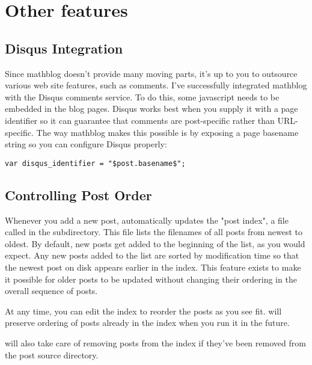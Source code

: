 \documentclass[11pt, letterpaper, oneside, titlepage]{book}
\begin{document}
\section{Other features}

\subsection{Disqus Integration}

Since mathblog doesn't provide many moving parts, it's up to you to
outsource various web site features, such as comments.  I've
successfully integrated mathblog with the Disqus comments service.  To
do this, some javascript needs to be embedded in the blog pages.
Disqus works best when you supply it with a page identifier so it can
guarantee that comments are post-specific rather than URL-specific.
The way mathblog makes this possible is by exposing a page basename
string so you can configure Disqus properly:

\begin{verbatim}
var disqus_identifier = "$post.basename$";
\end{verbatim}

\subsection{Controlling Post Order}

Whenever you add a new post,  automatically updates the "post
index", a file called  in the 
subdirectory.  This file lists the filenames of all posts from newest
to oldest.  By default, new posts get added to the beginning of the
list, as you would expect.  Any new posts added to the list are sorted
by modification time so that the newest post on disk appears earlier
in the index.  This feature exists to make it possible for older posts
to be updated without changing their ordering in the overall sequence
of posts.

At any time, you can edit the index to reorder the posts as you see
fit.   will preserve ordering of posts already in the index
when you run it in the future.

 will also take care of removing posts from the index if
they've been removed from the post source directory.
\end{document}
